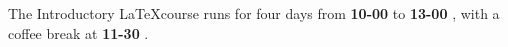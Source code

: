 \documentclass[a4paper]{report}
\newcommand{\timeofday}[2]{{\bfseries #1-#2 }}
\begin{document}
The Introductory \LaTeX course runs for four days from \timeofday{10}{00}to \timeofday{13}{00}, with a coffee break at \timeofday{11}{30}.
\end{document}
